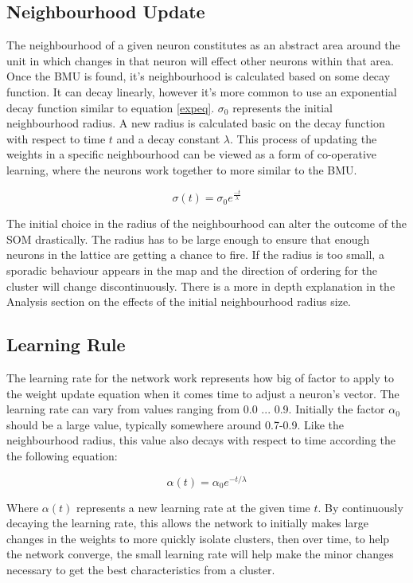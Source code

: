 \documentclass{IEEEtran}
\begin{document}
\subsection{Neighbourhood Update}
	The neighbourhood of a given neuron constitutes as an abstract area around the unit in which changes in that neuron will effect other neurons within that area. Once the BMU is found, it's neighbourhood is calculated based on some decay function. It can decay linearly, however it's more common to use an exponential decay function similar to equation \ref{expeq}. $\sigma_{0}$ represents the initial neighbourhood radius. A new radius is calculated basic on the decay function with respect to time $t$ and a decay constant $\lambda$. This process of updating the weights in a specific neighbourhood can be viewed as a form of co-operative learning, where the neurons work together to more similar to the BMU. \cite{thesom}  

\begin{equation}
\sigma(t) = \sigma_{0} e^{\frac{-t}{\lambda}}
\label{expeq}
\end{equation}

	The initial choice in the radius of the neighbourhood can alter the outcome of the SOM drastically. The radius has to be large enough to ensure that enough neurons in the lattice are getting a chance to fire. If the radius is too small, a sporadic behaviour appears in the map and the direction of ordering for the cluster will change discontinuously. \cite{thesom}  There is a more in depth explanation in the Analysis section on the effects of the initial neighbourhood radius size.

\subsection{Learning Rule}
	The learning rate for the network work represents how big of factor to apply to the weight update equation when it comes time to adjust a neuron's vector. The learning rate can vary from values ranging from 0.0 ... 0.9. Initially the factor $\alpha_{0}$ should be a large value, typically somewhere around 0.7-0.9. Like the neighbourhood radius, this value also decays with respect to time according the the following equation:

\begin{equation}
\alpha(t) = \alpha_{0} e^{-t/{\lambda}}
\end{equation}

Where $\alpha(t)$ represents a new learning rate at the given time $t$. By continuously decaying the learning rate, this allows the network to initially makes large changes in the weights to more quickly isolate clusters, then over time, to help the network converge, the small learning rate will help make the minor changes necessary to get the best characteristics from a cluster.
\end{document}
